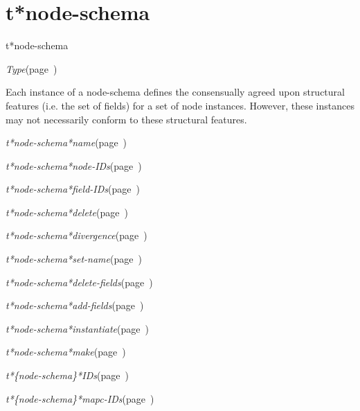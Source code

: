 \section{t*node-schema}
\label{t*node-schema}

\begin{description}
\item [Name:]  t*node-schema

\item [Layer:] {\sl Type}\hfill(page~\pageref{Type})

\item [Description:]

Each instance of a node-schema defines the consensually 
agreed upon structural features (i.e. the set of fields)
for a set of node instances.  However, these instances
may not necessarily conform to these structural 
features. 

\item [Attributes:]
\item {\sl t*node-schema*name}\hfill(page~\pageref{t*node-schema*name})
\item {\sl t*node-schema*node-IDs}\hfill(page~\pageref{t*node-schema*node-IDs})
\item {\sl t*node-schema*field-IDs}\hfill(page~\pageref{t*node-schema*field-IDs})

\item [Operations:]
\item {\sl t*node-schema*delete}\hfill(page~\pageref{t*node-schema*delete})
\item {\sl t*node-schema*divergence}\hfill(page~\pageref{t*node-schema*divergence})
\item {\sl t*node-schema*set-name}\hfill(page~\pageref{t*node-schema*set-name})
\item {\sl t*node-schema*delete-fields}\hfill(page~\pageref{t*node-schema*delete-fields})
\item {\sl t*node-schema*add-fields}\hfill(page~\pageref{t*node-schema*add-fields})
\item {\sl t*node-schema*instantiate}\hfill(page~\pageref{t*node-schema*instantiate})
\item {\sl t*node-schema*make}\hfill(page~\pageref{t*node-schema*make})

\item {\sl t*\{node-schema\}*IDs}\hfill(page~\pageref{t*node-schema*IDs})
\item {\sl t*\{node-schema\}*mapc-IDs}\hfill(page~\pageref{t*node-schema*mapc-IDs})

\item [Subclasses:]


\item [Superclasses:]


\item [Instances:]




\end{description}
\horizontalline

